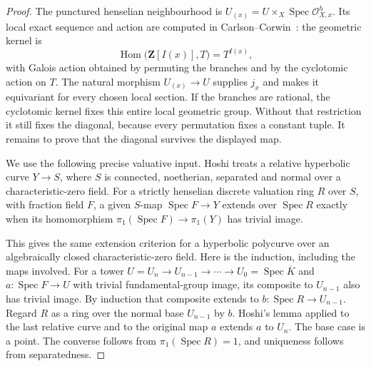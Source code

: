 \begin{proof}
The punctured henselian neighbourhood is
$U_{(x)}=U\times_X\operatorname{Spec}\mathcal O^h_{X,x}$.
Its local exact sequence and action are computed in
Carlson--Corwin~\cite[Proposition 3.4]{B_CarlsonCorwin2026}:
the geometric kernel is
\[
 \operatorname{Hom}\bigl(\mathbf Z[I(x)],T\bigr)=T^{I(x)},
\]
with Galois action obtained by permuting the branches and by the
cyclotomic action on $T$. The natural morphism $U_{(x)}\to U$ supplies
$j_x$ and makes it equivariant for every chosen local section. If the
branches are rational, the cyclotomic kernel fixes this entire local
geometric group. Without that restriction it still fixes the diagonal,
because every permutation fixes a constant tuple. It remains to prove
that the diagonal survives the displayed map.

We use the following precise valuative input. Hoshi
\cite[Lemma 2.8, pp.~175--176]{B_Hoshi2014} treats a relative hyperbolic
curve $Y\to S$, where $S$ is connected, noetherian, separated and
normal over a characteristic-zero field. For a strictly henselian
discrete valuation ring $R$ over $S$, with fraction field $F$, a given
$S$-map $\operatorname{Spec}F\to Y$ extends over
$\operatorname{Spec}R$ exactly when its homomorphism
$\pi_1(\operatorname{Spec}F)\to\pi_1(Y)$ has trivial image.

This gives the same extension criterion for a hyperbolic polycurve over
an algebraically closed characteristic-zero field. Here is the
induction, including the maps involved. For a tower
$U=U_n\to U_{n-1}\to\cdots\to U_0=\operatorname{Spec}\overline K$
and $a:\operatorname{Spec}F\to U$ with trivial fundamental-group
image, its composite to $U_{n-1}$ also has trivial image. By induction
that composite extends to $b:\operatorname{Spec}R\to U_{n-1}$.
Regard $R$ as a ring over the normal base $U_{n-1}$ by $b$.
Hoshi's lemma applied to the last relative curve and to the original
map $a$ extends $a$ to $U_n$. The base case is a point. The converse
follows from $\pi_1(\operatorname{Spec}R)=1$, and uniqueness follows
from separatedness.


\end{proof}

